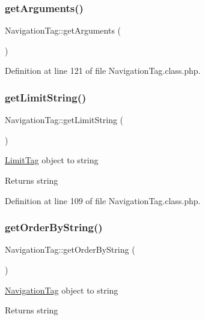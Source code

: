 \subsubsection{\texorpdfstring{get\+Arguments()}{getArguments()}}
{\footnotesize\ttfamily Navigation\+Tag\+::get\+Arguments (\begin{DoxyParamCaption}{ }\end{DoxyParamCaption})}



Definition at line 121 of file Navigation\+Tag.\+class.\+php.

\mbox{\label{classNavigationTag_a9adb174f58ed2ef92137970d0a7b2c81}} 
\subsubsection{\texorpdfstring{get\+Limit\+String()}{getLimitString()}}
{\footnotesize\ttfamily Navigation\+Tag\+::get\+Limit\+String (\begin{DoxyParamCaption}{ }\end{DoxyParamCaption})}

\hyperlink{classLimitTag}{Limit\+Tag} object to string \begin{DoxyReturn}{Returns}
string 
\end{DoxyReturn}


Definition at line 109 of file Navigation\+Tag.\+class.\+php.

\mbox{\label{classNavigationTag_a5d0ad196e149753b1adb58a1883f369d}} 
\subsubsection{\texorpdfstring{get\+Order\+By\+String()}{getOrderByString()}}
{\footnotesize\ttfamily Navigation\+Tag\+::get\+Order\+By\+String (\begin{DoxyParamCaption}{ }\end{DoxyParamCaption})}

\hyperlink{classNavigationTag}{Navigation\+Tag} object to string \begin{DoxyReturn}{Returns}
string 
\end{DoxyReturn}


